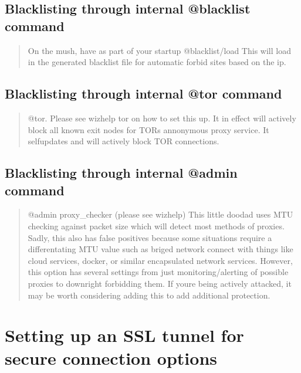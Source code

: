 \documentclass[letterpaper,10pt,english]{sphinxmanual}
\begin{document}
\subsection{Blacklisting through internal @blacklist command}
\label{\detokenize{security:blacklisting-through-internal-blacklist-command}}\begin{quote}

\sphinxAtStartPar
On the mush, have as part of your startup @blacklist/load
This will load in the generated blacklist file for automatic forbid
sites based on the ip.
\end{quote}


\subsection{Blacklisting through internal @tor command}
\label{\detokenize{security:blacklisting-through-internal-tor-command}}\begin{quote}

\sphinxAtStartPar
@tor.  Please see \textquotesingle{}wizhelp tor\textquotesingle{} on how to set this up.  It in effect
will actively block all known exit nodes for TOR\textquotesingle{}s annonymous proxy
service.  It self\sphinxhyphen{}updates and will actively block TOR connections.
\end{quote}


\subsection{Blacklisting through internal @admin command}
\label{\detokenize{security:blacklisting-through-internal-admin-command}}\begin{quote}

\sphinxAtStartPar
@admin proxy\_checker (please see wizhelp)
This little doodad uses MTU checking against packet size which will
detect most methods of proxies.  Sadly, this also has false positives
because some situations require a differentating MTU value such as
briged network connect with things like cloud services, docker, or
similar encapsulated network services.  However, this option has
several settings from just monitoring/alerting of possible proxies
to downright forbidding them.  If you\textquotesingle{}re being actively attacked,
it may be worth considering adding this to add additional protection.
\end{quote}


\section{Setting up an SSL tunnel for secure connection options}
\label{\detokenize{security:setting-up-an-ssl-tunnel-for-secure-connection-options}}
\end{document}
